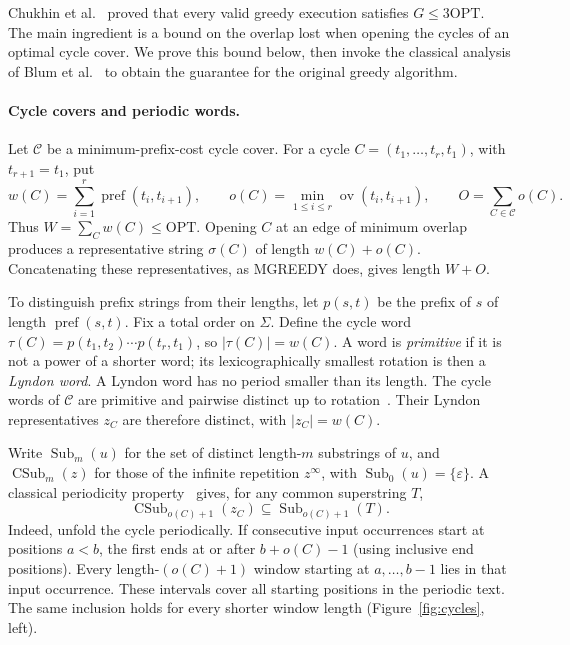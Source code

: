 \documentclass[11pt,a4paper]{article}   %
\theoremstyle{compact}
\theoremstyle{compactdef}
\newcommand{\OPT}{\mathrm{OPT}}
\newcommand{\GR}{G}                         %
\newcommand{\ov}{\operatorname{ov}}         %
\begin{document}
Chukhin et al.~\cite{CKMS26} proved that every valid greedy execution
satisfies $\GR\le 3\OPT$. The main ingredient is a bound on the overlap
lost when opening the cycles of an optimal cycle cover. We prove this
bound below, then invoke the classical analysis of Blum et
al.~\cite{BJLTY94} to obtain the guarantee for the original greedy algorithm.

\paragraph{Cycle covers and periodic words.}
Let $\mathcal C$ be a minimum-prefix-cost cycle cover. For a cycle
$C=(t_1,\ldots,t_r,t_1)$, with $t_{r+1}=t_1$, put
\[
  w(C)=\sum_{i=1}^{r}\operatorname{pref}(t_i,t_{i+1}),
  \qquad
  o(C)=\min_{1\le i\le r}\ov(t_i,t_{i+1}),
  \qquad
  O=\sum_{C\in\mathcal C}o(C).
\]
Thus $W=\sum_C w(C)\le\OPT$. Opening $C$ at an edge of minimum overlap
produces a representative string $\sigma(C)$ of length $w(C)+o(C)$.
Concatenating these representatives, as MGREEDY does, gives length $W+O$.

To distinguish prefix strings from their lengths, let $p(s,t)$ be the
prefix of $s$ of length $\operatorname{pref}(s,t)$. Fix a total order on
$\Sigma$. Define the cycle word
$\tau(C)=p(t_1,t_2)\cdots p(t_r,t_1)$, so $|\tau(C)|=w(C)$.
A word is \emph{primitive} if it is not a power of a shorter word; its
lexicographically smallest rotation is then a \emph{Lyndon word}.
A Lyndon word has no period smaller than its length.
The cycle words of $\mathcal C$ are primitive and pairwise distinct up
to rotation~\cite[Lemma 2.5]{Muc13}. Their Lyndon representatives $z_C$
are therefore distinct, with $|z_C|=w(C)$.

Write $\operatorname{Sub}_m(u)$ for the set of distinct length-$m$
substrings of $u$, and $\operatorname{CSub}_m(z)$ for those of the
infinite repetition $z^\infty$, with $\operatorname{Sub}_0(u)=\{\varepsilon\}$.
A classical periodicity property~\cite{BJLTY94} gives, for any common
superstring $T$,
\begin{equation}\label{eq:upper-forced-windows}
  \operatorname{CSub}_{o(C)+1}(z_C)
  \subseteq \operatorname{Sub}_{o(C)+1}(T).
\end{equation}
Indeed, unfold the cycle periodically. If consecutive input occurrences
start at positions $a<b$, the first ends at or after $b+o(C)-1$
(using inclusive end positions).
Every length-$(o(C)+1)$ window starting at $a,\ldots,b-1$ lies in that
input occurrence. These intervals cover all starting positions in the
periodic text. The same inclusion holds for every shorter window length
(Figure~\ref{fig:cycles}, left).
\end{document}
